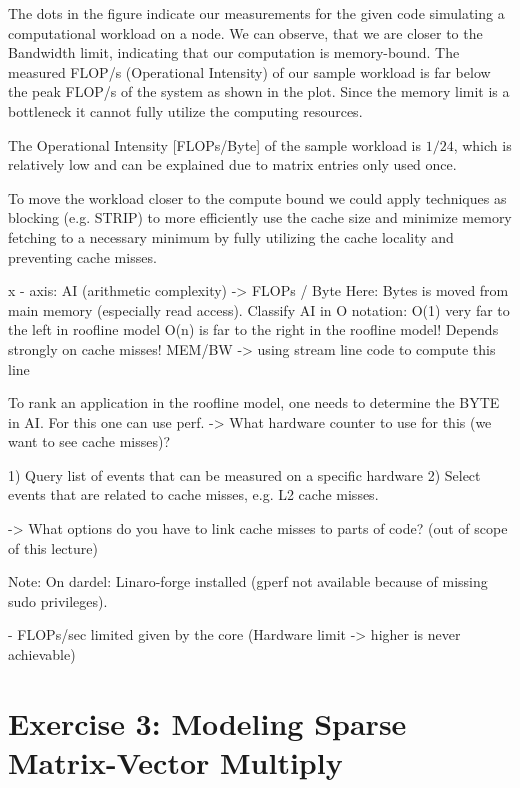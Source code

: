 \documentclass[a4paper,10pt]{article}
\begin{document}
The dots in the figure indicate our measurements for the given code simulating a computational workload
on a node. We can observe, that we are closer to the Bandwidth limit, indicating that our computation is 
memory-bound. 
The measured FLOP/s (Operational Intensity) of our sample workload is far below the peak FLOP/s of the system as shown in the plot. Since the memory limit is a bottleneck it cannot
fully utilize the computing resources.

The Operational Intensity [FLOPs/Byte] of the sample workload is $1/24$, which is relatively low and can be explained due to matrix entries only used once.

To move the workload closer to the compute bound we could apply techniques as blocking (e.g. STRIP) to more efficiently use
the cache size and minimize memory fetching to a necessary minimum by fully utilizing the cache locality and preventing cache misses.





x - axis: AI (arithmetic complexity) -> FLOPs / Byte
Here: Bytes is moved from main memory (especially read access).
Classify AI in O notation: O(1) very far to the left in roofline model
O(n) is far to the right in the roofline model!
Depends strongly on cache misses!
MEM/BW -> using stream line code to compute this line

To rank an application in the roofline model, one needs to determine the BYTE in AI.
For this one can use perf.
-> What hardware counter to use for this (we want to see cache misses)?

1) Query list of events that can be measured on a specific hardware
2) Select events that are related to cache misses, e.g. L2 cache misses.

-> What options do you have to link cache misses to parts of code? (out of scope of this lecture)

Note: On dardel: Linaro-forge installed (gperf not available because of missing sudo privileges).

- FLOPs/sec limited given by the core (Hardware limit -> higher is never achievable)

\section{Exercise 3: Modeling Sparse Matrix-Vector Multiply}
\end{document}
